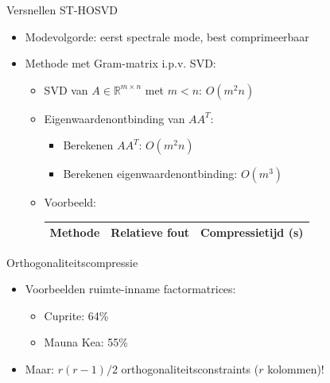 \documentclass[t,12pt,dutch
\ifx\beamermode\undefined\else,\beamermode\fi
]{beamer}
\begin{document}
\begin{frame}{Versnellen ST-HOSVD}

\begin{itemize}

\item Modevolgorde: eerst spectrale mode, best comprimeerbaar

\item Methode met Gram-matrix i.p.v. SVD:
\begin{itemize}

\item SVD van $A \in \mathbb{R}^{m \times n}$ met $m < n$: $O(m^2 n)$

\item Eigenwaardenontbinding van $A A^T$:
\begin{itemize}
\item Berekenen $A A^T$: $O(m^2 n)$
\item Berekenen eigenwaardenontbinding: $O(m^3)$
\end{itemize}

\item Voorbeeld:
\begin{table}[H]
\centering
\begin{tabular}{|l|l|l|}
\hline
Methode & Relatieve fout & Compressietijd (s)\\ \hline

\end{tabular}
\end{table}

\end{itemize}
\end{itemize}
\end{frame}

\begin{frame}{Orthogonaliteitscompressie}

\begin{itemize}
\item Voorbeelden ruimte-inname factormatrices:
\begin{itemize}
\item Cuprite: 64\%
\item Mauna Kea: 55\%
\end{itemize}
\item Maar: $r (r - 1)/2$ orthogonaliteitsconstraints ($r$ kolommen)!
\end{itemize}

\end{frame}

\iffalse
\end{document}
